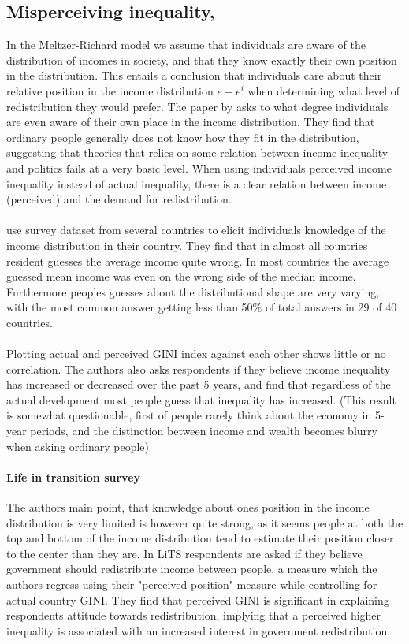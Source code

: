 \subsection{Misperceiving inequality, \citep{gimpelson_misperceiving_2018}}
In the Meltzer-Richard model we assume that individuals are aware of the distribution of incomes in society, and that they know exactly their own position in the distribution. This entails a conclusion that individuals care about their relative position in the income distribution $e-e^i$ when determining what level of redistribution they would prefer. The paper by \citeauthor{gimpelson_misperceiving_2018} asks to what degree individuals are even aware of their own place in the income distribution. They find that ordinary people generally does not know how they fit in the distribution, suggesting that theories that relies on some relation between income inequality and politics fails at a very basic level. When using individuals perceived income inequality instead of actual inequality, there is a clear relation between income (perceived) and the demand for redistribution. 
\\ \\ 
\citeauthor{gimpelson_misperceiving_2018} use survey dataset from several countries to elicit individuals knowledge of the income distribution in their country. They find that in almost all countries resident guesses the average income quite wrong. In most countries the average guessed mean income was even on the wrong side of the median income. Furthermore peoples guesses about the distributional shape are very varying, with the most common answer getting less than 50\% of total answers in 29 of 40 countries. 
\\ \\
Plotting actual and perceived GINI index against each other shows little or no correlation. The authors also asks respondents if they believe income inequality has increased or decreased over the past 5 years, and find that regardless of the actual development most people guess that inequality has increased. (This result is somewhat questionable, first of people rarely think about the economy in 5-year periods, and the distinction between income and wealth becomes blurry when asking ordinary people)

\paragraph{Life in transition survey} The authors main point, that knowledge about ones position in the income distribution is very limited is however quite strong, as it seems people at both the top and bottom of the income distribution tend to estimate their position closer to the center than they are. In LiTS respondents are asked if they believe government should redistribute income between people, a measure which the authors regress using their "perceived position" measure while controlling for actual country GINI. They find that perceived GINI is significant in explaining respondents attitude towards redistribution, implying that a perceived higher inequality is associated with an increased interest in government redistribution.

